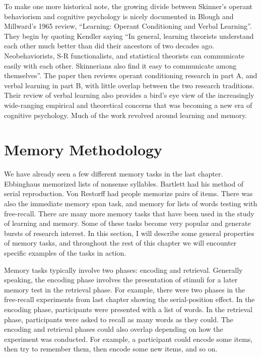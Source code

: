 \documentclass[
  oneside,
  12pt]{crumpbook}
\begin{document}
To make one more historical note, the growing divide between Skinner's operant behaviorism and cognitive psychology is nicely documented in Blough and Millward's 1965 review, ``Learning: Operant Conditioning and Verbal Learning''. They begin by quoting Kendler saying ``In general, learning theorists understand each other much better than did their ancestors of two decades ago. Neobehaviorists, S-R functionalists, and statistical theorists can communicate easily with each other. Skinnerians also find it easy to communicate among themselves''. The paper then reviews operant conditioning research in part A, and verbal learning in part B, with little overlap between the two research traditions. Their review of verbal learning also provides a bird's eye view of the increasingly wide-ranging empirical and theoretical concerns that was becoming a new era of cognitive psychology. Much of the work revolved around learning and memory.

\hypertarget{memory-methodology}{%
\section{Memory Methodology}\label{memory-methodology}}

We have already seen a few different memory tasks in the last chapter. Ebbinghaus memorized lists of nonsense syllables. Bartlett had his method of serial reproduction. Von Restorff had people memorize pairs of items. There was also the immediate memory span task, and memory for lists of words testing with free-recall. There are many more memory tasks that have been used in the study of learning and memory. Some of these tasks become very popular and generate bursts of research interest. In this section, I will describe some general properties of memory tasks, and throughout the rest of this chapter we will encounter specific examples of the tasks in action.

Memory tasks typically involve two phases: encoding and retrieval. Generally speaking, the encoding phase involves the presentation of stimuli for a later memory test in the retrieval phase. For example, there were two phases in the free-recall experiments from last chapter showing the serial-position effect. In the encoding phase, participants were presented with a list of words. In the retrieval phase, participants were asked to recall as many words as they could. The encoding and retrieval phases could also overlap depending on how the experiment was conducted. For example, a participant could encode some items, then try to remember them, then encode some new items, and so on.
\end{document}
